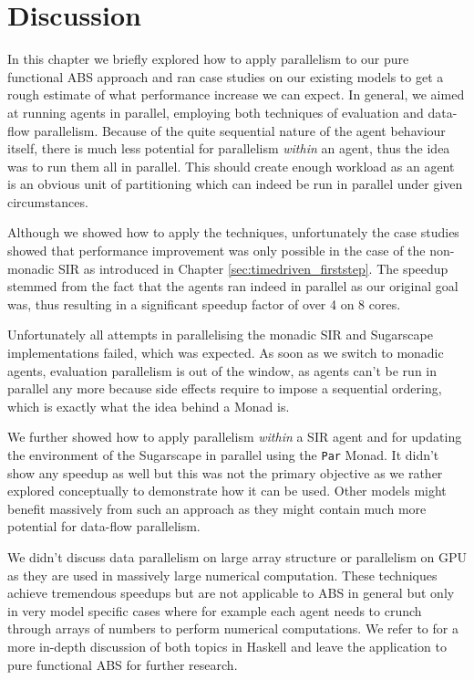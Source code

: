 \section{Discussion}
In this chapter we briefly explored how to apply parallelism to our pure functional ABS approach and ran case studies on our existing models to get a rough estimate of what performance increase we can expect. In general, we aimed at running agents in parallel, employing both techniques of evaluation and data-flow parallelism. Because of the quite sequential nature of the agent behaviour itself, there is much less potential for parallelism \textit{within} an agent, thus the idea was to run them all in parallel. This should create enough workload as an agent is an obvious unit of partitioning which can indeed be run in parallel under given circumstances.

Although we showed how to apply the techniques, unfortunately the case studies showed that performance improvement was only possible in the case of the non-monadic SIR as introduced in Chapter \ref{sec:timedriven_firststep}. The speedup stemmed from the fact that the agents ran indeed in parallel as our original goal was, thus resulting in a significant speedup factor of over 4 on 8 cores. 

Unfortunately all attempts in parallelising the monadic SIR and Sugarscape implementations failed, which was expected. As soon as we switch to monadic agents, evaluation parallelism is out of the window, as agents can't be run in parallel any more because side effects require to impose a sequential ordering, which is exactly what the idea behind a Monad is.

We further showed how to apply parallelism \textit{within} a SIR agent and for updating the environment of the Sugarscape in parallel using the \texttt{Par} Monad. It didn't show any speedup as well but this was not the primary objective as we rather explored conceptually to demonstrate how it can be used. Other models might benefit massively from such an approach as they might contain much more potential for data-flow parallelism.

We didn't discuss data parallelism on large array structure or parallelism on GPU as they are used in massively large numerical computation. These techniques achieve tremendous speedups but are not applicable to ABS in general but only in very model specific cases where for example each agent needs to crunch through arrays of numbers to perform numerical computations. We refer to \cite{marlow_parallel_2013} for a more in-depth discussion of both topics in Haskell and leave the application to pure functional ABS for further research.

